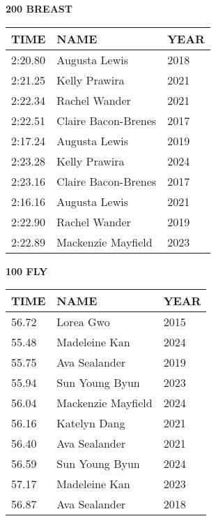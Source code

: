 \begin{minipage}[t]{0.48\textwidth}
\centering
\textbf{200 BREAST}\\[0.05cm]
\begin{tabular}{@{}p{1.8cm}p{2.8cm}p{1.2cm}@{}}
\hline
\textbf{TIME} & \textbf{NAME} & \textbf{YEAR} \\
\hline
2:20.80 & Augusta Lewis & 2018 \\
2:21.25 & Kelly Prawira & 2021 \\
2:22.34 & Rachel Wander & 2021 \\
2:22.51 & Claire Bacon-Brenes & 2017 \\
2:17.24 & Augusta Lewis & 2019 \\
2:23.28 & Kelly Prawira & 2024 \\
2:23.16 & Claire Bacon-Brenes & 2017 \\
2:16.16 & Augusta Lewis & 2021 \\
2:22.90 & Rachel Wander & 2019 \\
2:22.89 & Mackenzie Mayfield & 2023 \\
\hline
\end{tabular}
\end{minipage}\hfill
\begin{minipage}[t]{0.48\textwidth}
\centering
\textbf{100 FLY}\\[0.05cm]
\begin{tabular}{@{}p{1.8cm}p{2.8cm}p{1.2cm}@{}}
\hline
\textbf{TIME} & \textbf{NAME} & \textbf{YEAR} \\
\hline
56.72 & Lorea Gwo & 2015 \\
55.48 & Madeleine Kan & 2024 \\
55.75 & Ava Sealander & 2019 \\
55.94 & Sun Young Byun & 2023 \\
56.04 & Mackenzie Mayfield & 2024 \\
56.16 & Katelyn Dang & 2021 \\
56.40 & Ava Sealander & 2021 \\
56.59 & Sun Young Byun & 2024 \\
57.17 & Madeleine Kan & 2023 \\
56.87 & Ava Sealander & 2018 \\
\hline
\end{tabular}
\end{minipage}

\vspace{0.4cm}

